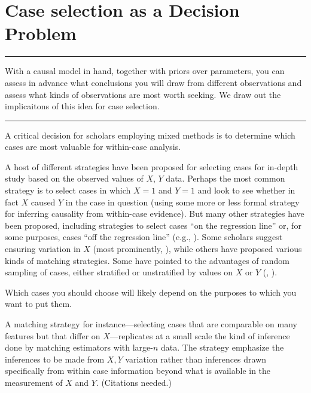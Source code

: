 \documentclass[12pt,]{book}
\begin{document}
\hypertarget{caseselection}{%
\chapter{Case selection as a Decision Problem}\label{caseselection}}

\begin{center}\rule{0.5\linewidth}{\linethickness}\end{center}

With a causal model in hand, together with priors over parameters, you can assess in advance what conclusions you will draw from different observations and assess what kinds of observations are most worth seeking. We draw out the implicaitons of this idea for case selection.

\begin{center}\rule{0.5\linewidth}{\linethickness}\end{center}

A critical decision for scholars employing mixed methods is to determine which cases are most valuable for within-case analysis.

A host of different strategies have been proposed for selecting cases for in-depth study based on the observed values of \(X\), \(Y\) data. Perhaps the most common strategy is to select cases in which \(X=1\) and \(Y=1\) and look to see whether in fact \(X\) caused \(Y\) in the case in question (using some more or less formal strategy for inferring causality from within-case evidence). But many other strategies have been proposed, including strategies to select cases ``on the regression line'' or, for some purposes, cases ``off the regression line'' (e.g., \citet{Lieberman2005nested}). Some scholars suggest ensuring variation in \(X\) (most prominently, \citet{king1994designing}), while others have proposed various kinds of matching strategies. Some have pointed to the advantages of random sampling of cases, either stratified or unstratified by values on \(X\) or \(Y\) (\citet{FL2008}, \citet{HerronQuinn}).

Which cases you should choose will likely depend on the purposes to which you want to put them.

A matching strategy for instance---selecting cases that are comparable on many features but that differ on \(X\)---replicates at a small scale the kind of inference done by matching estimators with large-\(n\) data. The strategy emphasize the inferences to be made from \(X,Y\) variation rather than inferences drawn specifically from within case information beyond what is available in the measurement of \(X\) and \(Y\). (Citations needed.)
\end{document}

